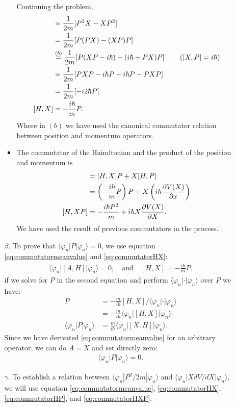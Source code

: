 \documentclass[letterpaper,11pt,twoside]{article}
\newcommand{\braket}[1]{\langle#1\rangle}
\begin{document}
\begin{enumerate}[itemsep=0pt,topsep=0pt,label=\alph*.]
\begin{enumerate}[itemsep=0pt,topsep=0pt]
\begin{itemize}[itemsep=0pt,topsep=0pt]
      Continuing the problem,
      \begin{align}
        [H,X]&=\frac{1}{2m}[P^2X-XP^2]\notag\\
        &=\frac{1}{2m}[P(PX)-(XP)P]\notag\\
        &\stackrel{(b)}{=}\frac{1}{2m}[P(XP-i\hbar)-(i\hbar+PX)P]\qquad\left([X,P]=i\hbar\right)\notag\\
        &=\frac{1}{2m}[PXP-i\hbar P-i\hbar P-PXP]\notag\\
        &=\frac{1}{2m}[-i2\hbar P]\notag\\
        [H,X]&=-\frac{i\hbar}{m}P.\label{eq:commutatorHX}
      \end{align}
      Where in $(b)$ we have used the canonical commutator relation between position and momentum operators.
      \item The commutator of the Haimltonian and the product of the position and momentum is
      \begin{align}
        [H,XP]&=[H,X]P+X[H,P]\notag\\
        &=\left(-\frac{i\hbar}{m}P\right)P+X\left(i\hbar\frac{\partial V(X)}{\partial x}\right)\notag\\
        [H,XP]&=-\frac{i\hbar P^2}{m}+i\hbar X\frac{\partial V(X)}{\partial X}.\label{eq:commutatorHXP}
      \end{align}  
      We have used the result of previous commutators in the process.
    \end{itemize}
    \item[$\beta$.]  To prove that $\braket{\varphi_n|P|\varphi_n}=0$, we use equation \eqref{eq:commutatormeanvalue} and \eqref{eq:commutatorHX}:
    \begin{align*}
      \braket{\varphi_n|[A,H]|\varphi_n}=0,\quad\text{and}\quad[H,X]=-\frac{i\hbar}{m}P.
    \end{align*}
    if we solve for $P$ in the second equation and perform $\braket{\varphi_n|\cdot|\varphi_n}$ over $P$ we have:
    \begin{align*}
      P&=-\frac{m}{i\hbar}[H,X]\bigr/\braket{\varphi_n|\cdot|\varphi_n}\\
      &=-\frac{m}{i\hbar}\braket{\varphi_n|[H,X]|\varphi_n}\\
      \braket{\varphi_n|P|\varphi_n}&=\frac{m}{i\hbar}\braket{\varphi_n|[X,H]|\varphi_n}.
    \end{align*}
    Since we have derivated \eqref{eq:commutatormeanvalue} for an arbitrary operator, we can do $A=X$ and set directly zero:
    \begin{align}
      \braket{\varphi_n|P|\varphi_n}=0.
    \end{align}
    \item[$\gamma$.] To establish a relation between $\braket{\varphi_n|P^2/2m|\varphi_n}$ and $\braket{\varphi_n|XdV/dX|\varphi_n}$, we will use equation 
    \eqref{eq:commutatormeanvalue}, \eqref{eq:commutatorHX}, \eqref{eq:commutatorHP}, and \eqref{eq:commutatorHXP}.


\end{enumerate}
\end{enumerate}
\end{document}
